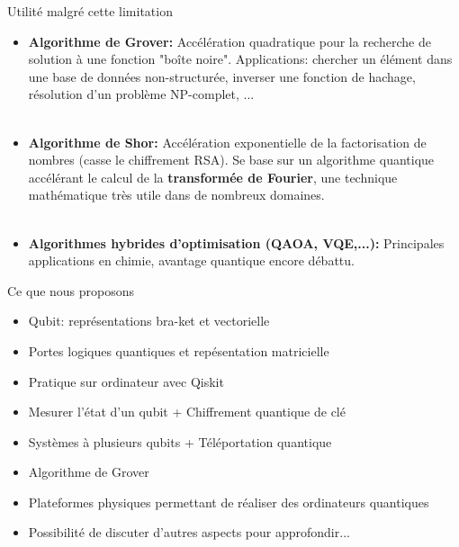 \documentclass[aspectratio=169,12pt]{beamer}
\begin{document}
\begin{frame}{Utilité malgré cette limitation}
  \begin{itemize}
    \item {\bf Algorithme de Grover:} Accélération quadratique pour la recherche de solution à une fonction "boîte noire". Applications: chercher un élément dans une base de données non-structurée, inverser une fonction de hachage, résolution d'un problème NP-complet, ... \\~\\
    \item {\bf Algorithme de Shor:} Accélération exponentielle de la factorisation de nombres (casse le chiffrement RSA). Se base sur un algorithme quantique accélérant le calcul de la {\bf transformée de Fourier}, une technique mathématique très utile dans de nombreux domaines. \\~\\
    \item {\bf Algorithmes hybrides d'optimisation (QAOA, VQE,...):} Principales applications en chimie, avantage quantique encore débattu.
  \end{itemize}
\end{frame}

\begin{frame}{Ce que nous proposons}
  
  \begin{itemize}
    \setlength{\itemsep}{0.8em}
    \item Qubit: représentations bra-ket et vectorielle
    \item Portes logiques quantiques et repésentation matricielle
    \item Pratique sur ordinateur avec Qiskit
    \item Mesurer l'état d'un qubit + Chiffrement quantique de clé
    \item Systèmes à plusieurs qubits + Téléportation quantique
    \item Algorithme de Grover
    \item Plateformes physiques permettant de réaliser des ordinateurs quantiques
    \item Possibilité de discuter d'autres aspects pour approfondir...
  \end{itemize}
\end{frame}
\end{document}
